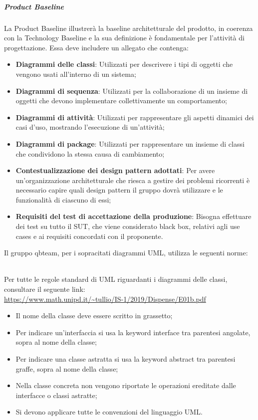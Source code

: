 \subparagraph*{Product Baseline}
La Product Baseline illustrerà la baseline architetturale del prodotto, in coerenza con la Technology Baseline e la sua definizione è fondamentale per l'attività di progettazione.
Essa deve includere un allegato che contenga:
\begin{itemize}
	\item \textbf{Diagrammi delle classi}: Utilizzati per descrivere i tipi di oggetti che vengono usati all'interno di un sistema;
	\item \textbf{Diagrammi di sequenza}: Utilizzati per la collaborazione di un insieme di oggetti che devono implementare collettivamente un comportamento;
	\item \textbf{Diagrammi di attività}: Utilizzati per rappresentare gli aspetti dinamici dei casi d'uso, mostrando l'esecuzione di un'attività;
	\item \textbf{Diagrammi di package}: Utilizzati per rappresentare un insieme di classi che condividono la stessa causa di cambiamento;
	\item \textbf{Contestualizzazione dei design pattern adottati}: Per avere un'organizzazione architetturale che riesca a gestire dei problemi ricorrenti è necessario capire quali design pattern il gruppo dovrà utilizzare e le funzionalità di ciascuno di essi;	
	\item \textbf{Requisiti del test di accettazione della produzione}: Bisogna effettuare dei test su tutto il SUT, che viene considerato black box, relativi agli use cases e ai requisiti concordati con il proponente.
\end{itemize}

Il gruppo qbteam, per i sopracitati diagrammi UML, utilizza le seguenti norme:
 
\mbox{}\\
Per tutte le regole standard di UML riguardanti i diagrammi delle classi, consultare il seguente link:
\\
 \url{https://www.math.unipd.it/~tullio/IS-1/2019/Dispense/E01b.pdf}
\begin{itemize}
	\item Il nome della classe deve essere scritto in grassetto;
	\item Per indicare un'interfaccia si usa la keyword interface tra parentesi angolate, sopra al nome della classe;
	\item Per indicare una classe astratta si usa la keyword abstract tra parentesi graffe, sopra al nome della classe;
	\item Nella classe concreta non vengono riportate le operazioni ereditate dalle interfacce o classi astratte;
	\item Si devono applicare tutte le convenzioni del linguaggio UML. 	
\end{itemize}

